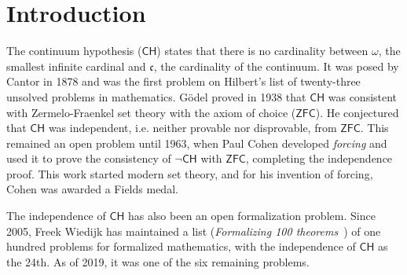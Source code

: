 \documentclass[sigplan,screen]{acmart}
\newcommand{\ZFC}{\mathsf{ZFC}}
\newcommand{\CH}{\mathsf{CH}}
\theoremstyle{definition}
\begin{document}



\maketitle


\section{Introduction}
\label{sect:intro}
The continuum hypothesis ($\mathsf{CH}$) states that there is no cardinality between $\omega$, the smallest infinite cardinal and $\mathfrak{c}$, the cardinality of the continuum.
It was posed by Cantor \cite{cantor1878beitrag} in 1878 and was the first problem on Hilbert's list of twenty-three unsolved problems in mathematics.
G\"odel \cite{godel1938consistency} proved in 1938 that $\mathsf{CH}$ was consistent with Zermelo-Fraenkel set theory with the axiom of choice ($\ZFC$). He conjectured that \(\mathsf{CH}\) was independent, i.e. neither provable nor disprovable, from \(\ZFC\). This remained an open problem until 1963, when Paul Cohen developed \emph{forcing} \cite{cohen-the-independence-of-the-continuum-hypothesis-1,cohen1964independence2} and used it to prove the consistency of $\neg \mathsf{CH}$ with \(\ZFC\), completing the independence proof. This work started modern set theory, and for his invention of forcing, Cohen was awarded a Fields medal.

The independence of \(\CH\) has also been an open formalization problem. Since 2005, Freek Wiedijk has maintained a list (\emph{Formalizing 100 theorems}~\cite{wiedijk100theorems}) of one hundred problems for formalized mathematics, with the independence of \(\CH\) as the 24th. As of 2019, it was one of the six remaining problems.
\end{document}
